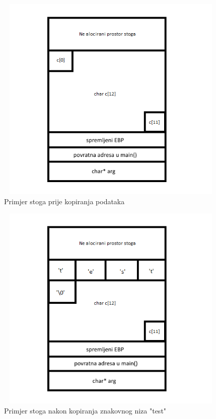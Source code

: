 \documentclass[times, utf8, diplomski, numeric]{fer}
\begin{document}
\pagebreak
\begin{figure}[!ht]
\centering
\setlength\fboxsep{0pt}
\setlength\fboxrule{0.5pt}
\includegraphics[width=12cm, height=10cm]{slike/buffer_overflow_nodata}
\caption{Primjer stoga prije kopiranja podataka}
\label{fig:buff_overflow_nodata} 
\end{figure} 

\begin{figure}[!ht]
\centering
\setlength\fboxsep{0pt}
\setlength\fboxrule{0.5pt}
\includegraphics[width=12cm, height=10cm]{slike/buffer_overflow_legitdata}
\caption{Primjer stoga nakon kopiranja znakovnog niza "test"}
\label{fig:buff_overflow_legitdata} 
\end{figure} 
\pagebreak
\end{document}
